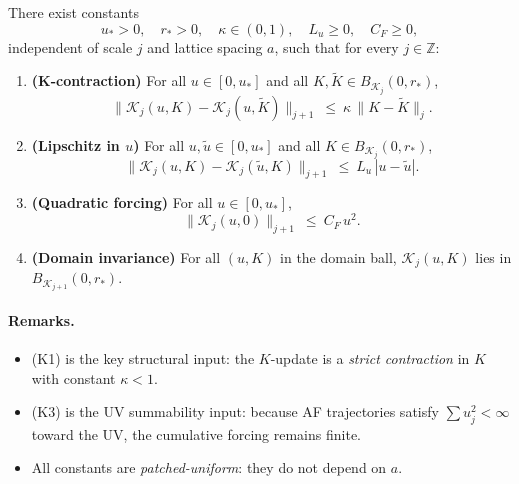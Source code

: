 \begin{proposition}\label{ass:RG_K}
There exist constants
\[
u_\ast>0,\quad r_\ast>0,\quad \kappa\in(0,1),\quad L_u\ge 0,\quad C_F\ge 0,
\]
independent of scale $j$ and lattice spacing $a$, such that for every $j\in\mathbb Z$:
\begin{enumerate}[label=(K\arabic*)]
\item \textbf{(K-contraction)} For all $u\in[0,u_\ast]$ and all $K,\widetilde K\in B_{\mathscr K_j}(0,r_\ast)$,
\begin{equation}\label{eq:K_contr}
\|\mathcal K_j(u,K)-\mathcal K_j(u,\widetilde K)\|_{j+1}\ \le\ \kappa\,\|K-\widetilde K\|_{j}.
\end{equation}
\item \textbf{(Lipschitz in $u$)} For all $u,\widetilde u\in[0,u_\ast]$ and all $K\in B_{\mathscr K_j}(0,r_\ast)$,
\begin{equation}\label{eq:K_Lipu}
\|\mathcal K_j(u,K)-\mathcal K_j(\widetilde u,K)\|_{j+1}\ \le\ L_u\,|u-\widetilde u|.
\end{equation}
\item \textbf{(Quadratic forcing)} For all $u\in[0,u_\ast]$,
\begin{equation}\label{eq:K_force}
\|\mathcal K_j(u,0)\|_{j+1}\ \le\ C_F\,u^2.
\end{equation}
\item \textbf{(Domain invariance)} For all $(u,K)$ in the domain ball, $\mathcal K_j(u,K)$ lies in $B_{\mathscr K_{j+1}}(0,r_\ast)$.
\end{enumerate}
\end{proposition}

\paragraph{Remarks.}
\begin{itemize}
\item (K1) is the key structural input: the $K$-update is a \emph{strict contraction} in $K$ with constant $\kappa<1$.
\item (K3) is the UV summability input: because AF trajectories satisfy $\sum u_j^2<\infty$ toward the UV, the cumulative forcing remains finite.
\item All constants are \emph{patched-uniform}: they do not depend on $a$.
\end{itemize}

